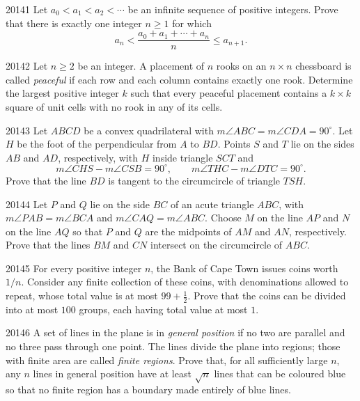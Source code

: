 
\begin{problem}{2014}{1}
Let $a_0<a_1<a_2<\cdots$ be an infinite sequence of positive integers. Prove that there is exactly one integer $n\geq1$ for which
\[
    a_n<\frac{a_0+a_1+\cdots+a_n}{n}\leq a_{n+1}.
\]
\end{problem}

\begin{problem}{2014}{2}
Let $n\geq2$ be an integer. A placement of $n$ rooks on an $n\times n$ chessboard is called \emph{peaceful} if each row and each column contains exactly one rook. Determine the largest positive integer $k$ such that every peaceful placement contains a $k\times k$ square of unit cells with no rook in any of its cells.
\end{problem}

\begin{problem}{2014}{3}
Let $ABCD$ be a convex quadrilateral with $m\angle ABC=m\angle CDA=90^\circ$. Let $H$ be the foot of the perpendicular from $A$ to $BD$. Points $S$ and $T$ lie on the sides $AB$ and $AD$, respectively, with $H$ inside triangle $SCT$ and
\[
    m\angle CHS-m\angle CSB=90^\circ,
    \qquad m\angle THC-m\angle DTC=90^\circ.
\]
Prove that the line $BD$ is tangent to the circumcircle of triangle $TSH$.
\end{problem}

\begin{problem}{2014}{4}
Let $P$ and $Q$ lie on the side $BC$ of an acute triangle $ABC$, with $m\angle PAB=m\angle BCA$ and $m\angle CAQ=m\angle ABC$. Choose $M$ on the line $AP$ and $N$ on the line $AQ$ so that $P$ and $Q$ are the midpoints of $AM$ and $AN$, respectively. Prove that the lines $BM$ and $CN$ intersect on the circumcircle of $ABC$.
\end{problem}

\begin{problem}{2014}{5}
For every positive integer $n$, the Bank of Cape Town issues coins worth $1/n$. Consider any finite collection of these coins, with denominations allowed to repeat, whose total value is at most $99+\frac12$. Prove that the coins can be divided into at most $100$ groups, each having total value at most $1$.
\end{problem}

\begin{problem}{2014}{6}
A set of lines in the plane is in \emph{general position} if no two are parallel and no three pass through one point. The lines divide the plane into regions; those with finite area are called \emph{finite regions}. Prove that, for all sufficiently large $n$, any $n$ lines in general position have at least $\sqrt n$ lines that can be coloured blue so that no finite region has a boundary made entirely of blue lines.
\end{problem}
